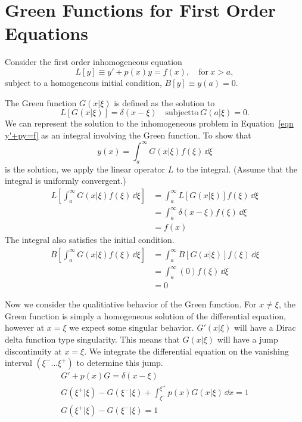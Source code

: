 \section{Green Functions for First Order Equations}



Consider the first order inhomogeneous equation
\begin{equation}
  \label{eqn y'+py=f}
  L[y] \equiv y' + p(x) y = f(x), \quad \mathrm{for}\ x > a,
\end{equation}
subject to a homogeneous initial condition, $B[y] \equiv y(a) = 0$.

The Green function $G(x|\xi)$ is defined as the solution to
\[ 
L[G(x|\xi)] = \delta(x-\xi) \quad \mathrm{subject to}\ G(a|\xi) = 0.
\]
We can represent the 
solution to the inhomogeneous problem in Equation~\ref{eqn y'+py=f}
as an integral involving the Green function.  To show that
\[
y(x) = \int_a^\infty G(x|\xi) f(\xi)\,\dd \xi
\]
is the solution, we apply the linear operator $L$ to the integral.
(Assume that the integral is uniformly convergent.)
\begin{align*}
  L\left[ \int_a^\infty G(x|\xi) f(\xi)\,\dd \xi\right] 
  &= \int_a^\infty L[G(x|\xi)] f(\xi)\,\dd \xi 
  \\
  &= \int_a^\infty \delta(x-\xi) f(\xi)\,\dd \xi 
  \\
  &= f(x)
\end{align*}
The integral also satisfies the initial condition.
\begin{align*}
  B\left[ \int_a^\infty G(x|\xi) f(\xi)\,\dd \xi\right]
  &= \int_a^\infty B[G(x|\xi)] f(\xi)\,\dd \xi 
  \\
  &= \int_a^\infty (0) f(\xi)\,\dd \xi 
  \\
  &= 0
\end{align*}

Now we consider the qualitiative behavior of the Green function.  For 
$x \neq \xi$, the Green function is simply a homogeneous solution of the 
differential equation, however at $x = \xi$ we expect some singular behavior.
$G'(x|\xi)$ will have a Dirac delta function type singularity.  This means that
$G(x|\xi)$ will have a jump discontinuity at $x = \xi$.
We integrate the differential equation on the vanishing interval 
$(\xi^- \ldots \xi^+)$ to determine this jump.
\begin{gather}
  G' + p(x) G = \delta(x-\xi)
  \nonumber
  \\
  G(\xi^+|\xi) - G(\xi^-|\xi) + \int_{\xi^-}^{\xi^+} p(x) G(x|\xi) \,\dd x = 1
  \nonumber
  \\
  \label{eqn first order G+ - G- = 1}
  G(\xi^+|\xi) - G(\xi^-|\xi) = 1
\end{gather}

